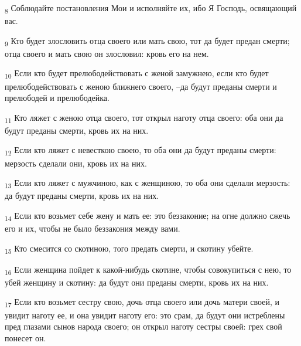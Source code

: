 \begin{tcolorbox}
\textsubscript{8} Соблюдайте постановления Мои и исполняйте их, ибо Я Господь, освящающий вас.
\end{tcolorbox}
\begin{tcolorbox}
\textsubscript{9} Кто будет злословить отца своего или мать свою, тот да будет предан смерти; отца своего и мать свою он злословил: кровь его на нем.
\end{tcolorbox}
\begin{tcolorbox}
\textsubscript{10} Если кто будет прелюбодействовать с женой замужнею, если кто будет прелюбодействовать с женою ближнего своего, --да будут преданы смерти и прелюбодей и прелюбодейка.
\end{tcolorbox}
\begin{tcolorbox}
\textsubscript{11} Кто ляжет с женою отца своего, тот открыл наготу отца своего: оба они да будут преданы смерти, кровь их на них.
\end{tcolorbox}
\begin{tcolorbox}
\textsubscript{12} Если кто ляжет с невесткою своею, то оба они да будут преданы смерти: мерзость сделали они, кровь их на них.
\end{tcolorbox}
\begin{tcolorbox}
\textsubscript{13} Если кто ляжет с мужчиною, как с женщиною, то оба они сделали мерзость: да будут преданы смерти, кровь их на них.
\end{tcolorbox}
\begin{tcolorbox}
\textsubscript{14} Если кто возьмет себе жену и мать ее: это беззаконие; на огне должно сжечь его и их, чтобы не было беззакония между вами.
\end{tcolorbox}
\begin{tcolorbox}
\textsubscript{15} Кто смесится со скотиною, того предать смерти, и скотину убейте.
\end{tcolorbox}
\begin{tcolorbox}
\textsubscript{16} Если женщина пойдет к какой-нибудь скотине, чтобы совокупиться с нею, то убей женщину и скотину: да будут они преданы смерти, кровь их на них.
\end{tcolorbox}
\begin{tcolorbox}
\textsubscript{17} Если кто возьмет сестру свою, дочь отца своего или дочь матери своей, и увидит наготу ее, и она увидит наготу его: это срам, да будут они истреблены пред глазами сынов народа своего; он открыл наготу сестры своей: грех свой понесет он.
\end{tcolorbox}

